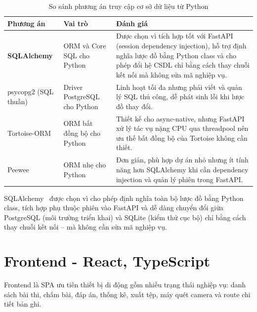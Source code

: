 \begin{table}[H]
\centering
\caption{So sánh phương án truy cập cơ sở dữ liệu từ Python}
\label{tab:so-sanh-orm}
\renewcommand{\arraystretch}{1.25}
\small
\begin{tabular}{|L{2.7cm}|L{4.1cm}|L{7.2cm}|}
\hline
\textbf{Phương án} & \textbf{Vai trò} & \textbf{Đánh giá} \\
\hline

\textbf{SQLAlchemy} &
ORM và Core SQL cho Python &
Được chọn vì tích hợp tốt với FastAPI (session dependency injection), hỗ trợ định nghĩa lược đồ bằng Python class và cho phép đổi hệ CSDL chỉ bằng cách thay chuỗi kết nối mà không sửa mã nghiệp vụ. \\
\hline

psycopg2 (SQL thuần) &
Driver PostgreSQL cho Python &
Linh hoạt tối đa nhưng phải viết và quản lý SQL thủ công, dễ phát sinh lỗi khi lược đồ thay đổi. \\
\hline

Tortoise-ORM &
ORM bất đồng bộ cho Python &
Thiết kế cho async-native, nhưng FastAPI xử lý tác vụ nặng CPU qua threadpool nên ưu thế bất đồng bộ của Tortoise không cần thiết. \\
\hline

Peewee &
ORM nhẹ cho Python &
Đơn giản, phù hợp dự án nhỏ nhưng ít tính năng hơn SQLAlchemy khi cần dependency injection và quản lý phiên trong FastAPI. \\
\hline

\end{tabular}
\normalsize
\end{table}

SQLAlchemy~\cite{sqlalchemy} được chọn vì cho phép định nghĩa toàn bộ lược đồ bằng Python class, tích hợp phụ thuộc phiên vào FastAPI và dễ dàng chuyển đổi giữa PostgreSQL (môi trường triển khai) và SQLite (kiểm thử cục bộ) chỉ bằng cách thay chuỗi kết nối -- mà không cần sửa mã nghiệp vụ.
\section{Frontend - React, TypeScript}

Frontend là SPA ưu tiên thiết bị di động gồm nhiều trạng thái nghiệp vụ: danh sách bài thi, chấm bài, đáp án, thống kê, xuất tệp, máy quét camera và route chi tiết bản ghi.


